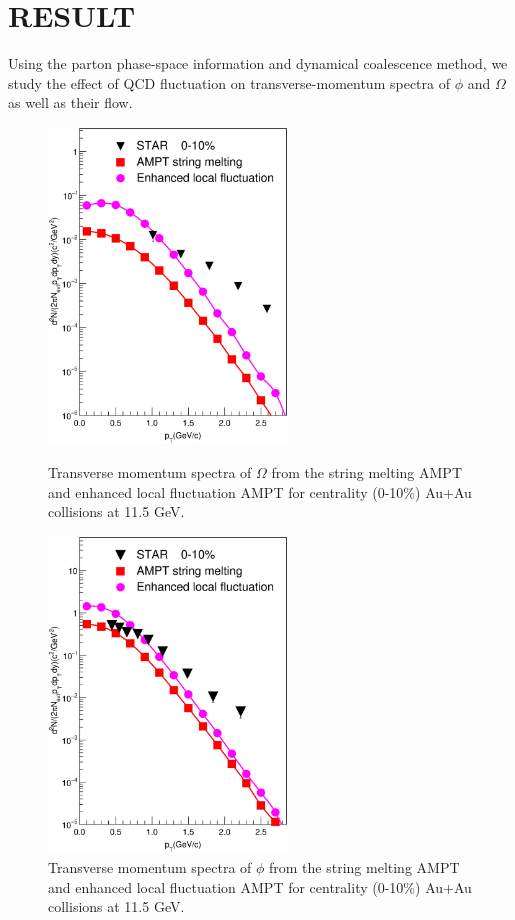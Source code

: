 \documentclass[11pt,a4paper,openany]{article}
\begin{document}
\section{RESULT}
Using the parton phase-space information and dynamical coalescence method, we study the effect
of QCD fluctuation on transverse-momentum spectra of $\phi$ and $\Omega$ as well as their flow.
\begin{figure}[!h]
  \begin{minipage}{0.5\textwidth}
    \centering
    \includegraphics[width=2.5in]{./figure/omegaYield.eps}
    \caption{Transverse momentum spectra of $\Omega$ from the string melting AMPT and enhanced local
fluctuation AMPT for centrality (0-10\%) Au+Au collisions at 11.5 GeV.}
    \label{fig:omegaspectra}
  \end{minipage}
  \begin{minipage}{0.5\textwidth}
    \centering
    \includegraphics[width=2.5in]{./figure/phiYield.eps}
    \caption{Transverse momentum spectra of $\phi$ from the string melting AMPT and enhanced local
fluctuation AMPT for centrality (0-10\%) Au+Au collisions at 11.5 GeV.}
    \label{fig:phispectra}
  \end{minipage}
\end{figure}
\end{document}

